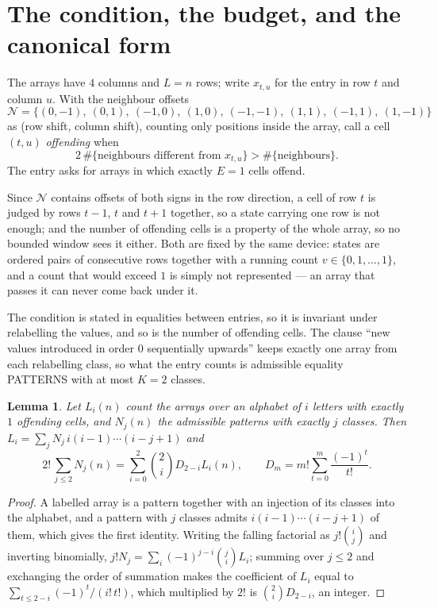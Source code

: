 \documentclass[11pt,a4paper]{article}
\theoremstyle{plain}
\newtheorem{lemma}[theorem]{Lemma}
\theoremstyle{definition}
\begin{document}
\section{The condition, the budget, and the canonical form}

The arrays have $4$ columns and $L=n$ rows; write $x_{t,u}$ for the entry in
row $t$ and column $u$. With the neighbour offsets
\[
\mathcal N=\{(0,-1),\ (0,1),\ (-1,0),\ (1,0),\ (-1,-1),\ (1,1),\ (-1,1),\ (1,-1)\}
\]
as (row shift, column shift), counting only positions inside the array, call a cell
$(t,u)$ \emph{offending} when
\[
2\,\#\{\text{neighbours different from }x_{t,u}\}>\#\{\text{neighbours}\} .
\]
The entry asks for arrays in which exactly $E=1$ cells offend.

Since $\mathcal N$ contains offsets of both signs in the row direction, a cell of row
$t$ is judged by rows $t-1$, $t$ and $t+1$ together, so a state carrying one row is not
enough; and the number of offending cells is a property of the whole array, so no bounded
window sees it either. Both are fixed by the same device: states are ordered pairs of
consecutive rows together with a running count $v\in\{0,1,\dots,1\}$, and a count that
would exceed $1$ is simply not represented --- an array that passes it can never come back
under it.

The condition is stated in equalities between entries, so it is invariant under relabelling
the values, and so is the number of offending cells. The clause ``new values introduced in
order $0$ sequentially upwards'' keeps exactly one array from each relabelling class, so what
the entry counts is admissible equality PATTERNS with at most $K=2$ classes.

\begin{lemma}\label{lem:inv}
Let $L_i(n)$ count the arrays over an alphabet of $i$ letters with exactly $1$ offending
cells, and $N_j(n)$ the admissible patterns with exactly $j$ classes. Then
$L_i=\sum_j N_j\,i(i-1)\cdots(i-j+1)$ and
\[
2!\,\sum_{j\le2}N_j(n)=\sum_{i=0}^{2}\binom{2}{i}D_{2-i}L_i(n),
\qquad D_m=m!\sum_{t=0}^{m}\frac{(-1)^t}{t!} .
\]
\end{lemma}

\begin{proof}
A labelled array is a pattern together with an injection of its classes into the alphabet,
and a pattern with $j$ classes admits $i(i-1)\cdots(i-j+1)$ of them, which gives the first
identity. Writing the falling factorial as $j!\binom{i}{j}$ and inverting binomially,
$j!N_j=\sum_i(-1)^{j-i}\binom{j}{i}L_i$; summing over $j\le2$ and exchanging the
order of summation makes the coefficient of $L_i$ equal to
$\sum_{t\le2-i}(-1)^t/(i!\,t!)$, which multiplied by $2!$ is
$\binom{2}{i}D_{2-i}$, an integer.
\end{proof}
\end{document}
